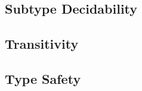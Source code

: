 \documentclass[runningheads]{llncs}
\begin{document}
\subsection{Subtype Decidability}

\subsection{Transitivity}

\subsection{Type Safety}

%
%
%
% 
% 
%
\begin{thebibliography}{8}
\end{thebibliography}
\end{document}
